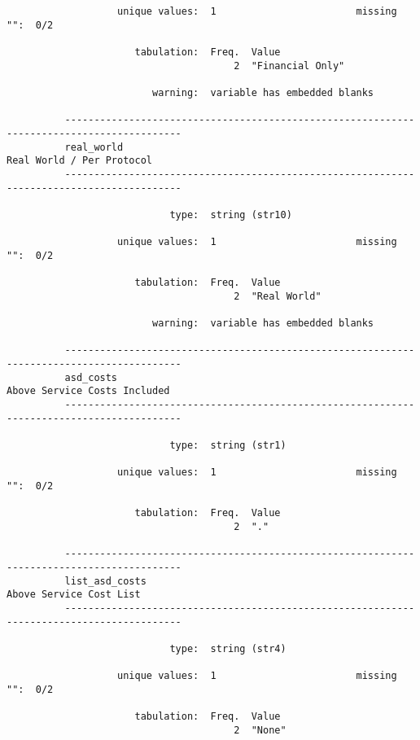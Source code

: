 \documentclass{article}
\begin{document}
\begin{verbatim}
                   unique values:  1                        missing "":  0/2
          
                      tabulation:  Freq.  Value
                                       2  "Financial Only"
          
                         warning:  variable has embedded blanks
          
          ------------------------------------------------------------------------------------------
          real_world                                                       Real World / Per Protocol
          ------------------------------------------------------------------------------------------
          
                            type:  string (str10)
          
                   unique values:  1                        missing "":  0/2
          
                      tabulation:  Freq.  Value
                                       2  "Real World"
          
                         warning:  variable has embedded blanks
          
          ------------------------------------------------------------------------------------------
          asd_costs                                                     Above Service Costs Included
          ------------------------------------------------------------------------------------------
          
                            type:  string (str1)
          
                   unique values:  1                        missing "":  0/2
          
                      tabulation:  Freq.  Value
                                       2  "."
          
          ------------------------------------------------------------------------------------------
          list_asd_costs                                                     Above Service Cost List
          ------------------------------------------------------------------------------------------
          
                            type:  string (str4)
          
                   unique values:  1                        missing "":  0/2
          
                      tabulation:  Freq.  Value
                                       2  "None"
          

\end{verbatim}
\end{document}
